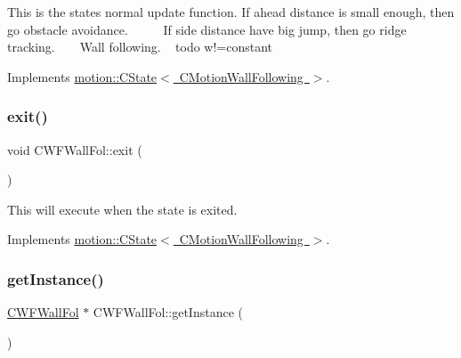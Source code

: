 This is the states normal update function. If ahead distance is small enough, then go obstacle avoidance. ~\newline
~\newline
~\newline
 If side distance have big jump, then go ridge tracking. ~\newline
~\newline
 Wall following. ~\newline
 todo w!=constant 

Implements \mbox{\hyperlink{classmotion_1_1CState_a71dc72d345b15bf3b5b5bff596a71f33}{motion\+::\+C\+State$<$ C\+Motion\+Wall\+Following $>$}}.

\mbox{\label{classmotion_1_1CWFWallFol_af90587d832a04a15d6c166e9b6a6afed}} 
\subsubsection{\texorpdfstring{exit()}{exit()}}
{\footnotesize\ttfamily void C\+W\+F\+Wall\+Fol\+::exit (\begin{DoxyParamCaption}\item[{\mbox{\hyperlink{classmotion_1_1CMotionWallFollowing}{C\+Motion\+Wall\+Following}} $\ast$}]{ }\end{DoxyParamCaption})\hspace{0.3cm}{\ttfamily [virtual]}}

This will execute when the state is exited. 

Implements \mbox{\hyperlink{classmotion_1_1CState_a353db064c159d66b82bf257b35e7c016}{motion\+::\+C\+State$<$ C\+Motion\+Wall\+Following $>$}}.

\mbox{\label{classmotion_1_1CWFWallFol_a56dd0cbd1e50c6e845a9c944e0b9a0a9}} 
\subsubsection{\texorpdfstring{get\+Instance()}{getInstance()}}
{\footnotesize\ttfamily \mbox{\hyperlink{classmotion_1_1CWFWallFol}{C\+W\+F\+Wall\+Fol}} $\ast$ C\+W\+F\+Wall\+Fol\+::get\+Instance (\begin{DoxyParamCaption}\item[{void}]{ }\end{DoxyParamCaption})\hspace{0.3cm}{\ttfamily [static]}}

